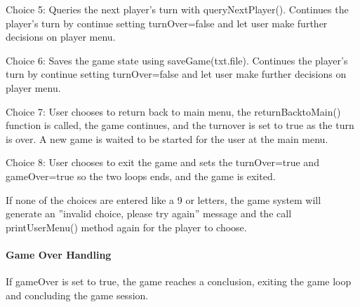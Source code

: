 \documentclass{article}
\begin{document}
Choice 5: Queries the next player’s turn with queryNextPlayer(). Continues the player's turn by continue setting turnOver=false and let user make further decisions on player menu.

Choice 6: Saves the game state using saveGame(txt.file). Continues the player's turn by continue setting turnOver=false and let user make further decisions on player menu.

Choice 7: User chooses to return back to main menu, the returnBacktoMain() function is called, the game continues, and the turnover is set to true as the turn is over. A new game is waited to be started for the user at the main menu.

Choice 8: User chooses to exit the game and sets the turnOver=true and gameOver=true so the two loops ends, and the game is exited.

If none of the choices are entered like a 9 or letters, the game system will generate an ”invalid choice, please try again” message and the call printUserMenu() method again for the player to choose.

\paragraph{Game Over Handling}
If gameOver is set to true, the game reaches a conclusion, exiting the game loop and concluding the game session.



\label{fig:strucrela}

\newpage

\label{fig:sequence}

\newpage
\end{document}
